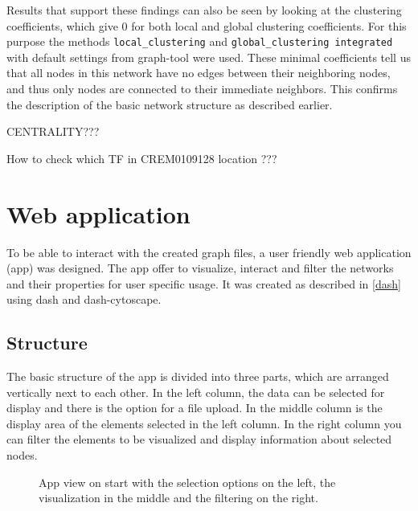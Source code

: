 \documentclass[pdftex,12pt,a4paper]{report}
\begin{document}
Results that support these findings can also be seen by looking at the clustering coefficients, which give 0 for both local and global clustering coefficients.  For this purpose the methods \texttt{local\_clustering} and \texttt{global\_clustering integrated} with default settings from graph-tool were used. These minimal coefficients tell us that all nodes in this network have no edges between their neighboring nodes, and thus only nodes are connected to their immediate neighbors. This confirms the description of the basic network structure as described earlier.

CENTRALITY???

How to check which TF in CREM0109128 location ???






\section{Web application}
To be able to interact with the created graph files, a user friendly web application (app) was designed. The app offer to visualize, interact and filter the networks and their properties for user specific usage. It was created as described in \ref{dash} using dash and dash-cytoscape.

\subsection{Structure}
The basic structure of the app is divided into three parts, which are arranged vertically next to each other. In the left column, the data can be selected for display and there is the option for a file upload. In the middle column is the display area of the elements selected in the left column. In the right column you can filter the elements to be visualized and display information about selected nodes. 

\begin{figure}[!ht]
\begin{center}
	\caption{App view on start with the selection options on the left, the visualization in the middle and the filtering on the right.}
	\label{webapp}
\end{center}
\end{figure}
\end{document}
